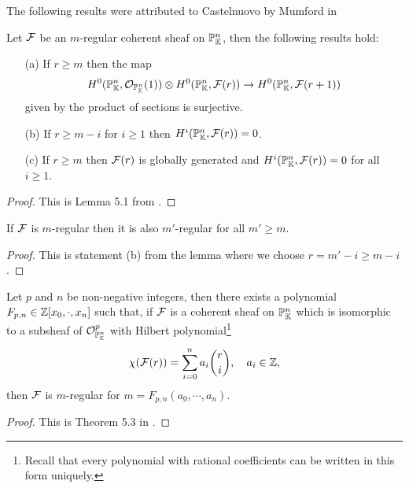 The following results were attributed to Castelnuovo by Mumford in \cite{mumford1966lectures}
\begin{lemma}[Castelnuovo]\label{CastelnuovoLemma}
Let $\mathcal{F}$ be an $m$-regular coherent sheaf on $\mathbb{P}^n_{\mathbb{K}}$, then the following results hold:
\begin{enumerate}
\item[\rm(a)] If $r\geq m$ then the map
\[H^0(\mathbb{P}^n_{\mathbb{K}},\mathcal{O}_{\mathbb{P}^n_{\mathbb{K}}}(1))\otimes H^0(\mathbb{P}^n_{\mathbb{K}},\mathcal{F}(r))\to H^0(\mathbb{P}^n_{\mathbb{K}},\mathcal{F}(r+1))\]
given by the product of sections is surjective.
\item[\rm(b)] If $r\geq m-i$ for $i\geq 1$ then $H^i(\mathbb{P}^n_{\mathbb{K}},\mathcal{F}(r))=0$.
\item[\rm(c)] If $r\geq m$ then $\mathcal{F}(r)$ is globally generated and $H^i(\mathbb{P}^n_{\mathbb{K}},\mathcal{F}(r))=0$ for all $i\geq 1$.
\end{enumerate}
\end{lemma}
\begin{proof}
This is Lemma 5.1 from \cite{FGAEXPLAINED}.
\end{proof}

\begin{corollary}\label{RegularityUnboundedAbove}
If $\mathcal{F}$ is $m$-regular then it is also $m'$-regular for all $m'\geq m$.
\end{corollary}
\begin{proof}
This is statement (b) from the lemma where we choose $r=m'-i\geq m-i$.
\end{proof}

\begin{theorem}[Mumford]\label{MumfordTheorem}
Let $p$ and $n$ be non-negative integers, then there exists a polynomial $F_{p,n}\in\mathbb{Z}[x_0,\cdot, x_n]$ such that, if $\mathcal{F}$ is a coherent sheaf on $\mathbb{P}^n_{\mathbb{K}}$ which is isomorphic to a subsheaf of $\mathcal{O}^p_{\mathbb{P}^n_{\mathbb{K}}}$ with Hilbert polynomial\footnote{Recall that every polynomial with rational coefficients can be written in this form uniquely.}
\[\chi(\mathcal{F}(r))=\sum_{i=0}^na_i\binom ri,\quad a_i\in\mathbb{Z},\]
then $\mathcal{F}$ is $m$-regular for $m=F_{p,n}(a_0,\cdots, a_n)$.
\end{theorem}
\begin{proof}
This is Theorem 5.3 in \cite{FGAEXPLAINED}.
\end{proof}

